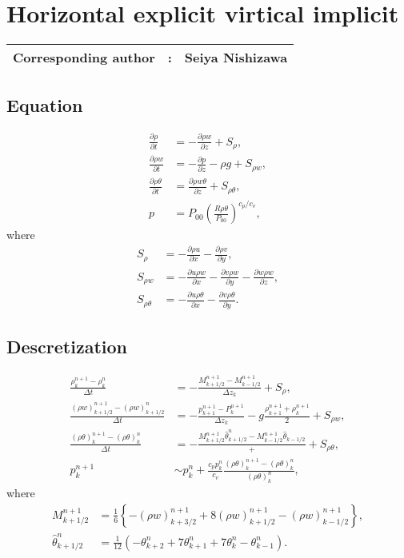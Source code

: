 \chapter{Horizontal explicit virtical implicit}
\label{chap:hevi}
{\bf \Large 
\begin{tabular}{ccc}
\hline
  Corresponding author & : & Seiya Nishizawa\\
\hline
\end{tabular}
}

\section{Equation}

\begin{align}
  \frac{\partial \rho}{\partial t}
  &= -\frac{\partial \rho w}{\partial z} + S_\rho, \\
  \frac{\partial \rho w}{\partial t}
  &= -\frac{\partial p}{\partial z} -\rho g + S_{\rho w}, \\
  \frac{\partial \rho\theta}{\partial t}
  &= \frac{\partial \rho w\theta}{\partial z} + S_{\rho\theta}, \\
  p &= P_{00}\left(\frac{R\rho\theta}{P_{00}}\right)^{c_p/c_v},
\end{align}
where
\begin{align}
  S_\rho &= - \frac{\partial \rho u}{\partial x}
           - \frac{\partial \rho v}{\partial y}, \\
  S_{\rho w} &= - \frac{\partial u\rho w}{\partial x}
              - \frac{\partial v\rho w}{\partial y}
              - \frac{\partial w\rho w}{\partial z}, \\
  S_{\rho\theta} &= - \frac{\partial u\rho\theta}{\partial x}
                 - \frac{\partial v\rho\theta}{\partial y}.
\end{align}

\section{Descretization}
\begin{align}
  \frac{\rho_k^{n+1}-\rho_k^n}{\Delta t}
  &= -\frac{M_{k+1/2}^{n+1}-M_{k-1/2}^{n+1}}{\Delta z_k} + S_\rho, \\
  \frac{(\rho w)_{k+1/2}^{n+1}-(\rho w)_{k+1/2}^n}{\Delta t}
  &= -\frac{p_{k+1}^{n+1}-P_k^{n+1}}{\Delta z_k} -g\frac{\rho_{k+1}^{n+1}+\rho_k^{n+1}}{2} + S_{\rho w}, \\
  \frac{(\rho\theta)_k^{n+1}-(\rho\theta)_k^n}{\Delta t}
  &= -\frac{M_{k+1/2}^{n+1}\hat{\theta}_{k+1/2}^n-M_{k-1/2}^{n+1}\hat{\theta}_{k-1/2}} + + S_{\rho\theta}, \\
  p_k^{n+1} &\sim p_k^n + \frac{c_pp_k^n}{c_v}\frac{(\rho\theta)_k^{n+1}-(\rho\theta)_k^n}{(\rho\theta)_k^n},
\end{align}
where
\begin{align}
  M_{k+1/2}^{n+1}
  &= \frac{1}{6}\left\{-(\rho w)_{k+3/2}^{n+1}+8(\rho w)_{k+1/2}^{n+1}-(\rho w)_{k-1/2}^{n+1}\right\}, \\
  \hat{\theta}_{k+1/2}^n
  &= \frac{1}{12}(-\theta_{k+2}^n+7\theta_{k+1}^n+7\theta_k^n-\theta_{k-1}^n).
\end{align}

